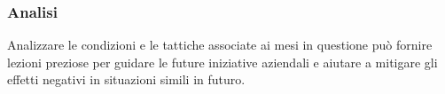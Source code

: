 \subsubsection{Analisi}
Analizzare le condizioni e le tattiche associate ai mesi in questione può fornire lezioni preziose per guidare le future iniziative aziendali e aiutare a mitigare gli effetti negativi in situazioni simili in futuro.